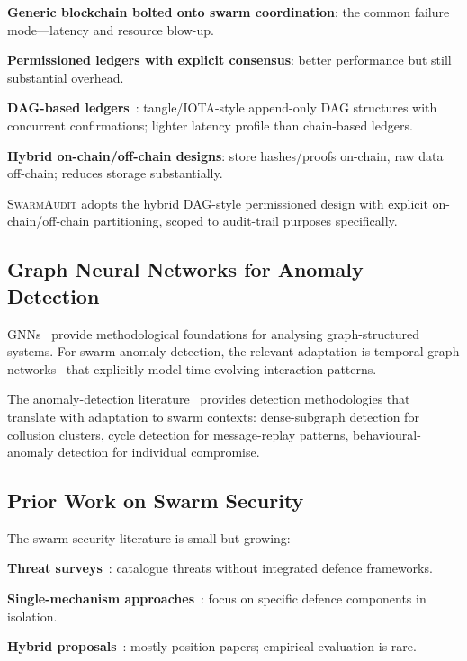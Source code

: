 \documentclass[sigconf,nonacm]{acmart}
\begin{document}
\textbf{Generic blockchain bolted onto swarm coordination}: the
common failure mode---latency and resource blow-up.

\textbf{Permissioned ledgers with explicit consensus}: better
performance but still substantial overhead.

\textbf{DAG-based ledgers}~\cite{popov2018iota,
crystalmovich2024dag}: tangle/IOTA-style append-only DAG
structures with concurrent confirmations; lighter latency
profile than chain-based ledgers.

\textbf{Hybrid on-chain/off-chain designs}: store hashes/proofs
on-chain, raw data off-chain; reduces storage substantially.

\textsc{SwarmAudit} adopts the hybrid DAG-style permissioned
design with explicit on-chain/off-chain partitioning, scoped to
audit-trail purposes specifically.

\subsection{Graph Neural Networks for Anomaly Detection}

GNNs~\cite{kipf2017gcn,velickovic2018gat,rossi2020tgn} provide
methodological foundations for analysing graph-structured systems.
For swarm anomaly detection, the relevant adaptation is temporal
graph networks~\cite{rossi2020tgn} that explicitly model
time-evolving interaction patterns.

The anomaly-detection
literature~\cite{liu2024fraudgnn,xu2024graphfraudsurv} provides
detection methodologies that translate with adaptation to swarm
contexts: dense-subgraph detection for collusion clusters, cycle
detection for message-replay patterns, behavioural-anomaly
detection for individual compromise.

\subsection{Prior Work on Swarm Security}

The swarm-security literature is small but growing:

\textbf{Threat surveys}~\cite{benziane2024dronesec,
saxena2024dronesurv}: catalogue threats without integrated
defence frameworks.

\textbf{Single-mechanism approaches}~\cite{martinovic2024bcispoof,
he2024dronesim}: focus on specific defence components in
isolation.

\textbf{Hybrid proposals}~\cite{kapitonov2024robotchain}: mostly
position papers; empirical evaluation is rare.
\end{document}
